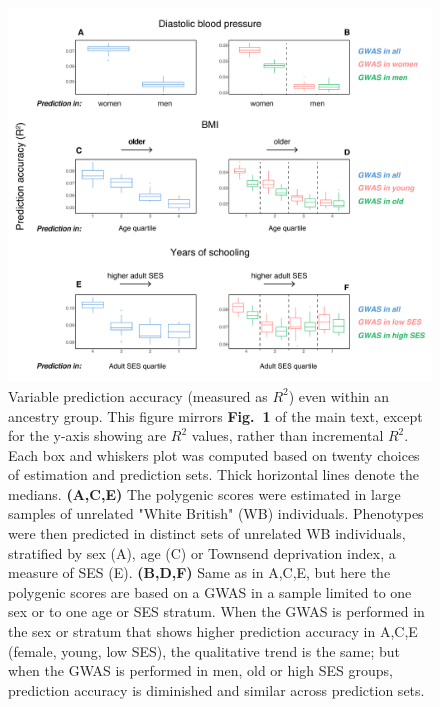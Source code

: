 \documentclass[hidelinks, 12pt]{article}
\begin{document}
\begin{figure}[h]
\centering
\includegraphics[width=\textwidth]{supp_figures/supp_raw_R2_to_env_boxplot_nice.pdf}
\caption[Variable prediction accuracy (measured as $R^2$) even within an ancestry group.]{\small Variable prediction accuracy (measured as $R^2$) even within an ancestry group.  This figure mirrors {\bf Fig.~1} of the main text, except for the y-axis showing are $R^2$ values, rather than incremental $R^2$.  Each box and whiskers plot was computed based on twenty choices of estimation and prediction sets. Thick horizontal lines denote the medians.  {\bf (A,C,E)} The polygenic scores were estimated in large samples of unrelated "White British" (WB) individuals. Phenotypes were then predicted in distinct sets of unrelated WB individuals, stratified by sex (A), age (C) or Townsend deprivation index, a measure of SES (E).  {\bf (B,D,F)} Same as in A,C,E, but here the polygenic scores are based on a GWAS in a sample limited to one sex or to one age or SES stratum.  When the GWAS is performed in the sex or stratum that shows higher prediction accuracy in A,C,E (female, young, low SES), the qualitative trend is the same; but when the GWAS is performed in men, old or high SES groups, prediction accuracy is diminished and similar across prediction sets.}
\label{fig:prediction_accuracy_strata_r2_including_covariates}
\end{figure}

\pagebreak
\end{document}
